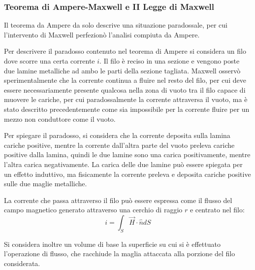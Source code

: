 \documentclass{article}
\numberwithin{equation}{subsection}
\begin{document}
\subsubsection{Teorema di Ampere-Maxwell e II Legge di Maxwell}
Il teorema da Ampere da solo descrive una situazione paradossale, per cui l'intervento di Maxwell perfezionò l'analisi compiuta da Ampere. 

Per descrivere il paradosso contenuto nel teorema di Ampere si considera un filo dove scorre una certa corrente $i$. Il filo è reciso in una sezione e vengono poste due 
lamine metalliche ad ambo le parti della sezione tagliata. Maxwell osservò sperimentalmente che la corrente continua a fluire nel resto del filo, per cui deve essere 
necessariamente presente qualcosa nella zona di vuoto tra il filo capace di muovere le cariche, per cui paradossalmente la corrente attraversa il vuoto, ma è stato descritto 
precedentemente come sia impossibile per la corrente fluire per un mezzo non conduttore come il vuoto. 

Per spiegare il paradosso, si considera che la corrente deposita sulla lamina cariche positive, mentre la corrente dall'altra parte del vuoto preleva cariche positive dalla lamina, 
quindi le due lamine sono una carica positivamente, mentre l'altra carica negativamente. La carica delle due lamine può essere spiegata per un effetto induttivo, ma fisicamente 
la corrente preleva e deposita cariche positive sulle due maglie metalliche. 


La corrente che passa attraverso il filo può essere espressa come il flusso del campo magnetico generato attraverso una cerchio di raggio $r$ e centrato nel filo:
\begin{equation*}
    i=\int_S{\vec{H}}\cdot\hat{n}dS
\end{equation*} 

Si considera inoltre un volume di base la superficie su cui si è effettuato l'operazione di flusso, che racchiude la maglia attaccata alla porzione del filo considerata. 
\end{document}

